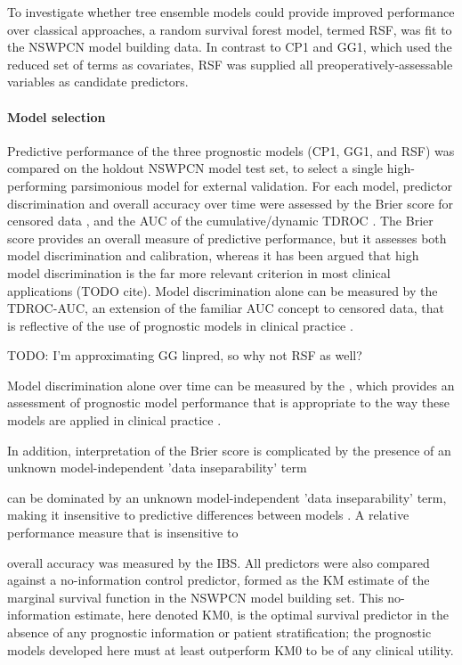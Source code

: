 \documentclass[dissertation.tex]{subfiles}
\begin{document}
To investigate whether tree ensemble models could provide improved performance over classical approaches, a random survival forest model, termed RSF, was fit to the \gls{NSWPCN} model building data.  In contrast to CP1 and GG1, which used the reduced set of terms as covariates, RSF was supplied all preoperatively-assessable variables as candidate predictors.

\paragraph{Model selection}
Predictive performance of the three prognostic models (CP1, GG1, and RSF) was compared on the holdout \gls{NSWPCN} model test set, to select a single high-performing parsimonious model for external validation.  For each model, predictor discrimination and overall accuracy over time were assessed by the Brier score for censored data \cite{Graf1999}, and the \gls{AUC} of the cumulative/dynamic \gls{TDROC} \cite{Blanche2013}.  The Brier score provides an overall measure of predictive performance, but it assesses both model discrimination and calibration, whereas it has been argued that high model discrimination is the far more relevant criterion in most clinical applications (TODO cite).  Model discrimination alone can be measured by the \gls{TDROC}-\gls{AUC}, an extension of the familiar \gls{AUC} concept to censored data, that is reflective of the use of prognostic models in clinical practice \cite{Heagerty2005}.  

TODO: I'm approximating GG linpred, so why not RSF as well?

Model discrimination alone over time can be measured by the , which provides an assessment of prognostic model performance that is appropriate to the way these models are applied in clinical practice \cite{Blanche2013a}.

In addition, interpretation of the Brier score is complicated by the presence of an unknown model-independent 'data inseparability' term

can be dominated by an unknown model-independent 'data inseparability' term, making it insensitive to predictive differences between models \cite{Graf1999}.  A relative performance measure that is insensitive to 




overall accuracy was measured by the \gls{IBS}.  All predictors were also compared against a no-information control predictor, formed as the \gls{KM} estimate of the marginal survival function in the \gls{NSWPCN} model building set.  This no-information estimate, here denoted KM0, is the optimal survival predictor in the absence of any prognostic information or patient stratification; the prognostic models developed here must at least outperform KM0 to be of any clinical utility.
\end{document}
